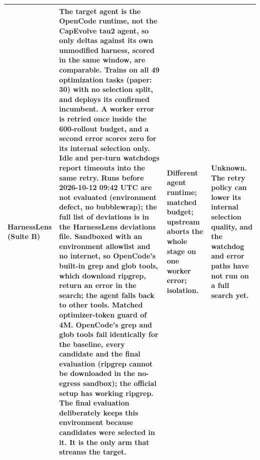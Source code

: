 \begin{table}[t]
\begin{tabularx}{\textwidth}{@{}l>{\raggedright\arraybackslash}X>{\raggedright\arraybackslash}X>{\raggedright\arraybackslash}X@{}}
HarnessLens (Suite B) & The target agent is the OpenCode runtime, not the CapEvolve tau2 agent, so only deltas against its own unmodified harness, scored in the same window, are comparable. Trains on all 49 optimization tasks (paper: 30) with no selection split, and deploys its confirmed incumbent. A worker error is retried once inside the 600-rollout budget, and a second error scores zero for its internal selection only. Idle and per-turn watchdogs report timeouts into the same retry. Runs before 2026-10-12 09:42 UTC are not evaluated (environment defect, no bubblewrap); the full list of deviations is in the HarnessLens deviations file. Sandboxed with an environment allowlist and no internet, so OpenCode's built-in grep and glob tools, which download ripgrep, return an error in the search; the agent falls back to other tools. Matched optimizer-token guard of 4M. OpenCode's grep and glob tools fail identically for the baseline, every candidate and the final evaluation (ripgrep cannot be downloaded in the no-egress sandbox); the official setup has working ripgrep. The final evaluation deliberately keeps this environment because candidates were selected in it. It is the only arm that streams the target. & Different agent runtime; matched budget; upstream aborts the whole stage on one worker error; isolation. & Unknown. The retry policy can lower its internal selection quality, and the watchdog and error paths have not run on a full search yet. \\
\bottomrule
\end{tabularx}
\end{table}
